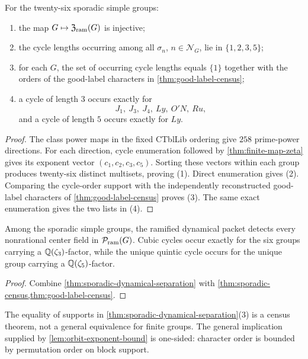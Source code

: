 \begin{theorem}
\label{thm:sporadic-dynamical-separation}
For the twenty-six sporadic simple groups:
\begin{enumerate}
\item the map \(G\mapsto\mathfrak Z_{\rm ram}(G)\) is injective;
\item the cycle lengths occurring among all
      \(\sigma_n\), \(n\in\mathcal N_G\), lie in
      \(\{1,2,3,5\}\);
\item for each \(G\), the set of occurring cycle lengths equals
      \(\{1\}\) together with the orders of the good-label characters in
      \cref{thm:good-label-census};
\item a cycle of length \(3\) occurs exactly for
      \[
      J_1,\ J_3,\ J_4,\ Ly,\ O'N,\ Ru,
      \]
      and a cycle of length \(5\) occurs exactly for \(Ly\).
\end{enumerate}
\end{theorem}

\begin{proof}
The class power maps in the fixed CTblLib ordering give \(258\)
prime-power directions.  For each direction, cycle enumeration followed by
\cref{thm:finite-map-zeta} gives its exponent vector
\((c_1,c_2,c_3,c_5)\).  Sorting these vectors within each group produces
twenty-six distinct multisets, proving (1).  Direct enumeration gives
(2).  Comparing the cycle-order support with the independently reconstructed
good-label characters of \cref{thm:good-label-census} proves (3).
The same exact enumeration gives the two lists in (4).
\end{proof}

\begin{corollary}
\label{cor:dynamics-cyclotomic-detection}
Among the sporadic simple groups, the ramified dynamical packet detects
every nonrational center field in \(\mathcal P_{\mathrm{ram}}(G)\).  Cubic cycles occur exactly
for the six groups carrying a \(\mathbb Q(\zeta_3)\)-factor, while the unique
quintic cycle occurs for the unique group carrying a
\(\mathbb Q(\zeta_5)\)-factor.
\end{corollary}

\begin{proof}
Combine \cref{thm:sporadic-dynamical-separation} with
\cref{thm:sporadic-census,thm:good-label-census}.
\end{proof}

\begin{remark}
The equality of supports in
\cref{thm:sporadic-dynamical-separation}(3) is a census theorem, not a
general equivalence for finite groups.  The general implication supplied
by \cref{lem:orbit-exponent-bound} is one-sided: character order is bounded
by permutation order on block support.
\end{remark}
